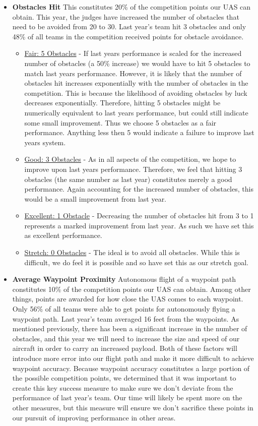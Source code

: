 \documentclass[]{auvsi_doc}
\begin{document}
\begin{itemize}
\item \textbf{Obstacles Hit} This constitutes 20\% of the competition points our UAS can obtain. This year, the judges have increased the number of obstacles that need to be avoided from 20 to 30. Last year's team hit 3 obstacles and only 48\% of all teams in the competition received points for obstacle avoidance.
	\begin{itemize}
	\item  \underline{Fair: 5 Obstacles} -  If last years performance is scaled for the increased number of obstacles (a 50\% increase) we would have to hit 5 obstacles to match last years performance. However, it is likely that the number of obstacles hit increases exponentially with the number of obstacles in the competition. This is because the likelihood of avoiding obstacles by luck decreases exponentially. Therefore, hitting 5 obstacles might be numerically equivalent to last years performance, but could still indicate some small improvement. Thus we choose 5 obstacles as a fair performance. Anything less then 5 would indicate a failure to improve last years system.
	\item \underline{Good: 3 Obstacles} -  As in all aspects of the competition, we hope to improve upon last years performance. Therefore, we feel that hitting 3 obstacles (the same number as last year) constitutes merely a good performance. Again accounting for the increased number of obstacles, this would be a small improvement from last year.
	\item \underline{Excellent: 1 Obstacle} -  Decreasing the number of obstacles hit from 3 to 1 represents a marked improvement from last year. As such we have set this as excellent performance.
	\item \underline{Stretch: 0 Obstacles} - The ideal is to avoid all obstacles. While this is difficult, we do feel it is possible and so have set this as our stretch goal.
	\end{itemize}
\item \textbf{Average Waypoint Proximity} Autonomous flight of a waypoint path constitutes 10\% of the competition points our UAS can obtain. Among other things, points are awarded for how close the UAS comes to each waypoint. Only 56\% of all teams were able to get points for autonomously flying a waypoint path. Last year's team averaged 16 feet from the waypoints.  As mentioned previously, there has been a significant increase in the number of obstacles, and this year we will need to increase the size and speed of our aircraft in order to carry an increased payload. Both of these factors will introduce more error into our flight path and make it more difficult to achieve waypoint accuracy. Because waypoint accuracy constitutes a large portion of the possible competition points, we determined that it was important to create this key success measure to make sure we don't deviate from the performance of last year's team. Our time will likely be spent more on the other measures, but this measure will ensure we don't sacrifice these points in our pursuit of improving performance in other areas.

\end{itemize}
\end{document}
